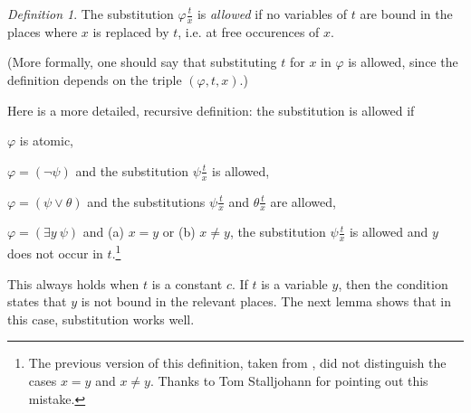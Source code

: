 \documentclass[a4paper, 11pt]{amsart}
\theoremstyle{remark}
\newtheorem{definition}[definition]{Definition}
\newenvironment{enumerate-(1)}{\begin{enumerate}[label={\upshape (\arabic*)}, leftmargin=2pc]}{\end{enumerate}}
\begin{document}
\begin{definition} 
The substitution $\varphi\frac{t}{x}$ is \emph{allowed} if no variables of $t$ are bound in the places where $x$ is replaced by $t$, i.e. at free occurences of $x$. 

(More formally, one should say that substituting $t$ for $x$ in $\varphi$ is allowed, since the definition depends on the triple $(\varphi,t,x)$.) 

Here is a more detailed, recursive definition: 
the substitution is allowed if 
\begin{enumerate-(1)} 
\item 
$\varphi$ is atomic, 
\item 
$\varphi=(\neg \psi)$ and the substitution $\psi\frac{t}{x}$ is allowed, 
\item 
$\varphi=(\psi \vee \theta)$ and the substitutions $\psi\frac{t}{x}$ and $\theta\frac{t}{x}$ are allowed, 
\item 
$\varphi=(\exists y\ \psi)$ and (a) $x=y$ or (b) $x\neq y$, the substitution $\psi\frac{t}{x}$ is allowed and $y$ does not occur in $t$.\footnote{The previous version of this definition, taken from \cite[page 14]{ziegler2010mathematische}, did not distinguish the cases $x=y$ and $x\neq y$. Thanks to Tom Stalljohann for pointing out this mistake.} 
\end{enumerate-(1)}


\end{definition} 

This always holds when $t$ is a constant $c$. 
If $t$ is a variable $y$, then the condition states that $y$ is not bound in the relevant places. 
The next lemma shows that in this case, substitution works well. 

\end{document}
